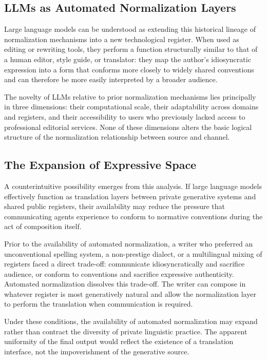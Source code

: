 \documentclass[12pt,a4paper]{article}
\theoremstyle{definition}
\theoremstyle{plain}
\theoremstyle{remark}
\begin{document}
\subsection{LLMs as Automated Normalization Layers}

Large language models can be understood as extending this historical lineage of normalization
mechanisms into a new technological register. When used as editing or rewriting tools, they
perform a function structurally similar to that of a human editor, style guide, or translator:
they map the author's idiosyncratic expression into a form that conforms more closely to
widely shared conventions and can therefore be more easily interpreted by a broader audience.

The novelty of LLMs relative to prior normalization mechanisms lies principally in three
dimensions: their computational scale, their adaptability across domains and registers, and
their accessibility to users who previously lacked access to professional editorial services.
None of these dimensions alters the basic logical structure of the normalization relationship
between source and channel.

\subsection{The Expansion of Expressive Space}

A counterintuitive possibility emerges from this analysis. If large language models
effectively function as translation layers between private generative systems and shared
public registers, their availability may reduce the pressure that communicating agents
experience to conform to normative conventions during the act of composition itself.

Prior to the availability of automated normalization, a writer who preferred an unconventional
spelling system, a non-prestige dialect, or a multilingual mixing of registers faced a direct
trade-off: communicate idiosyncratically and sacrifice audience, or conform to conventions
and sacrifice expressive authenticity. Automated normalization dissolves this trade-off. The
writer can compose in whatever register is most generatively natural and allow the normalization
layer to perform the translation when communication is required.

Under these conditions, the availability of automated normalization may expand rather than
contract the diversity of private linguistic practice. The apparent uniformity of the final
output would reflect the existence of a translation interface, not the impoverishment of the
generative source.
\end{document}
